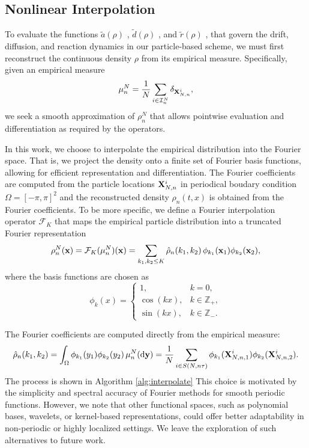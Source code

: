\documentclass[12pt]{article}
\begin{document}
\subsection{Nonlinear Interpolation}
\label{sec:interpolation}
To evaluate the functions $\tilde a(\rho)$ ,  $\tilde d(\rho)$ , and $\tilde r(\rho)$ , that govern the drift, diffusion, and reaction dynamics in our particle-based scheme, we must first reconstruct the continuous density 
$\rho$ from its empirical measure. Specifically, given an empirical measure
\[
\mu^N_n= \frac{1}{N}\sum_{i\in \mathcal I^N_n}\delta_{\mathbf{X}_{N,n}^i},
\] 
we seek a smooth approximation of $\rho^N_n$ that allows pointwise evaluation and differentiation as required by the operators.

In this work, we choose to interpolate the empirical distribution into the Fourier space. That is, we project the density onto a finite set of Fourier basis functions, allowing for efficient representation and differentiation. The Fourier coefficients are computed from the particle locations $\mathbf{X}_{N,n}^i$ in periodical boudary condition $\Omega=[-\pi,\pi]^2$ and the reconstructed density 
$\rho_n(t,x)$ is obtained from the Fourier coefficients. To be more specific, we define a Fourier interpolation operator $\mathcal F_K$
that maps the empirical particle distribution into a truncated Fourier representation 
\[
\rho^N_n(\mathbf{x}) = \mathcal{F}_K(\mu^N_n)(\mathbf{x}) 
          = \sum_{k_1,k_2\leq K} \hat{\rho}_n(k_1,k_2)\,\phi_{k_1}(\mathbf{x}_1)\phi_{k_2}(\mathbf{x}_2),
\]
where the basis functions are chosen as
\[
\phi_k(x) =
\begin{cases}
1, & k=0, \\
\cos(k  x), & k \in \mathbb{Z}_+, \\
\sin(k  x), & k \in \mathbb{Z}_- .
\end{cases}
\]

The Fourier coefficients are computed directly from the empirical measure:
\[
\hat{\rho}_n(k_1,k_2) = \int_\Omega \phi_{k_1}(y_1)\phi_{k_2}(y_2)\,\mu^N_n(\mathrm{d}\mathbf{y}) 
= \frac{1}{N}\sum_{i\in S(N,n\tau)} \phi_{k_1}(\mathbf{X}_{N,    n,1}^{i})\phi_{k_2}(\mathbf{X}_{N,n,2}^{i}).
\]
The process is shown in Algorithm \ref{alg:interpolate}
This choice is motivated by the simplicity and spectral accuracy of Fourier methods for smooth periodic functions. However, we note that other functional spaces, such as polynomial bases, wavelets, or kernel-based representations, could offer better adaptability in non-periodic or highly localized settings. We leave the exploration of such alternatives to future work.
\end{document}
